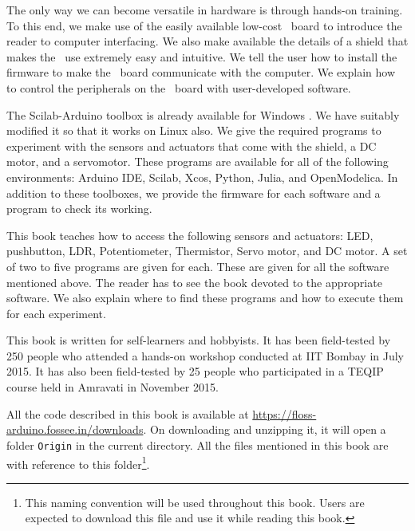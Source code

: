 The only way we can become versatile in hardware is through hands-on
training. To this end, we make use of the easily available low-cost
\arduino\ board to introduce the reader to computer interfacing. We
also make available the details of a shield that makes the
\arduino\ use extremely easy and intuitive. We tell the user how to
install the firmware to make the \arduino\ board communicate with the
computer. We explain how to control the peripherals on the
\arduino\ board with user-developed software.

The Scilab-Arduino toolbox is already available for Windows
\cite{scilab-arduino}. We have suitably modified it so that it works
on Linux also. We give the required programs to experiment with the
sensors and actuators that come with the shield, a DC motor, and a
servomotor. These programs are available for all of the following
environments: Arduino IDE, Scilab, Xcos, Python, Julia, and
OpenModelica. In addition to these toolboxes, we provide the firmware
for each software and a program to check its working.

This book teaches how to access the following sensors and actuators:
LED, pushbutton, LDR, Potentiometer, Thermistor, Servo motor, and DC motor. A set of two to five programs are given for each. These are given for all the
software mentioned above. The reader has to see the book devoted to
the appropriate software. We also explain where to find these
programs and how to execute them for each experiment.

This book is written for self-learners and hobbyists. It has been
field-tested by 250 people who attended a hands-on workshop conducted
at IIT Bombay in July 2015. It has also been field-tested by 25
people who participated in a TEQIP course held in Amravati in November
2015.

All the code described in this book is available at
\url{https://floss-arduino.fossee.in/downloads}.  On
downloading and unzipping it, it will open a folder {\tt Origin} in
the current directory.  All the files mentioned in this book are
with reference to this folder\footnote{\label{fn:file-loc}This naming
  convention will be used throughout this book.  Users are expected to
  download this file and use it while reading this book.}.
